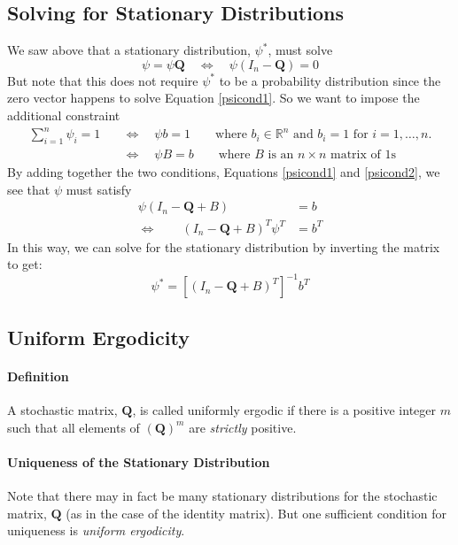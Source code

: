 \documentclass[a4paper,12pt]{scrartcl}
\begin{document}
\subsection{Solving for Stationary Distributions}

We saw above that a stationary distribution, $\psi^*$, must solve 
\begin{equation}
    \label{psicond1}
    \psi = \psi \mathbf{Q} \quad \Leftrightarrow \quad
    \psi \left(I_n - \mathbf{Q}\right) = 0
\end{equation}
But note that this does not require $\psi^*$ to be a probability
distribution since the zero vector happens to solve Equation
\ref{psicond1}. So we want to impose the additional constraint
\begin{align}
    \sum_{i=1}^n \psi_i = 1 \quad &\Leftrightarrow \quad
    \psi b = 1 \qquad \text{where $b_i \in \mathbb{R}^n$ and
				$b_i=1$ for $i=1,\ldots,n$.} \nonumber \\ 
    &\Leftrightarrow \quad \psi B = b 
    \qquad \text{where $B$ is an $n\times n$ matrix of 1s}
    \label{psicond2}
\end{align}
By adding together the two conditions, Equations \ref{psicond1}
and \ref{psicond2}, we see that $\psi$ must satisfy 
\begin{align*}
    \psi \left(I_n - \mathbf{Q} + B\right) &= b \\
    \Leftrightarrow \qquad
	\left(I_n - \mathbf{Q} + B\right)^T \psi^T &= b^T 
\end{align*}
In this way, we can solve for the stationary distribution
by inverting the matrix to get:
\begin{equation}
    \psi^* = \left[\left(I_n - \mathbf{Q} + B\right)^T\right]^{-1}
	b^T
\end{equation}


\subsection{Uniform Ergodicity} 

\paragraph{Definition}
A stochastic matrix, $\mathbf{Q}$,
is called uniformly ergodic if there is a positive
integer $m$ such that all elements of $\left(\mathbf{Q}\right)^m$
are \emph{strictly} positive.

\paragraph{Uniqueness of the Stationary Distribution}
Note that there may in fact be
many stationary distributions for the stochastic matrix,
$\mathbf{Q}$ (as in the case of the identity matrix).
But one sufficient condition for uniqueness is 
\emph{uniform ergodicity}.  
\end{document}
